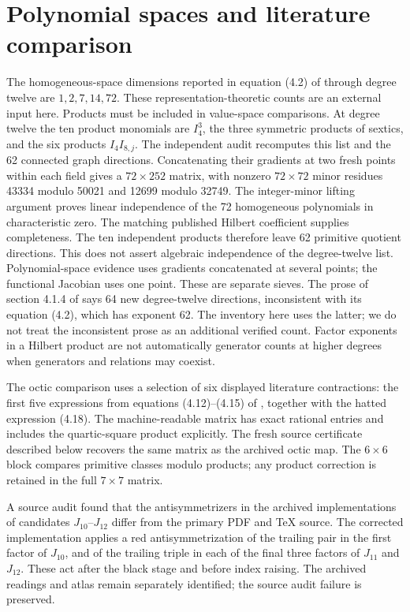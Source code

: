 \documentclass[11pt]{article}
\begin{document}
\section{Polynomial spaces and literature comparison}
The homogeneous-space dimensions reported in equation (4.2) of
\cite{cederwall} through degree twelve are $1,2,7,14,72$.
These representation-theoretic counts are an external input here. Products must be included in value-space comparisons.
At degree twelve the ten product monomials are $I_4^3$, the three symmetric
products of sextics, and the six products $I_4 I_{8,j}$. The independent audit
recomputes this list and the 62 connected graph directions. Concatenating
their gradients at two fresh points within each field gives a $72\times252$
matrix, with nonzero $72\times72$ minor residues 43334 modulo 50021 and 12699
modulo 32749. The integer-minor lifting argument proves linear independence
of the 72 homogeneous polynomials in characteristic zero. The matching
published Hilbert coefficient supplies completeness. The ten independent
products therefore leave 62 primitive quotient directions. This does not
assert algebraic independence of the degree-twelve list. Polynomial-space
evidence uses gradients concatenated at several points; the functional
Jacobian uses one point. These are separate sieves. The prose of section 4.1.4 of
\cite{cederwall} says 64 new degree-twelve directions, inconsistent with its
equation (4.2), which has exponent 62. The inventory here uses the latter;
we do not treat the inconsistent prose as an additional verified count.
Factor exponents in a Hilbert product are not automatically generator counts
at higher degrees when generators and relations may coexist.

The octic comparison uses a selection of six displayed literature
contractions: the first five expressions from equations (4.12)--(4.15) of
\cite{cederwall}, together with the hatted expression (4.18). The
machine-readable matrix has exact rational entries and includes
the quartic-square product explicitly. The fresh source certificate described
below recovers the same matrix as the archived octic map.
The $6\times6$ block compares primitive classes modulo products; any product
correction is retained in the full $7\times7$ matrix.

A source audit found that the antisymmetrizers in the archived implementations
of candidates $J_{10}$--$J_{12}$ differ from the primary PDF and TeX source.
The corrected implementation applies a red antisymmetrization of the trailing
pair in the first factor of $J_{10}$, and of the trailing triple in each of
the final three factors of $J_{11}$ and $J_{12}$. These act after the black
stage and before index raising. The archived readings and atlas remain
separately identified; the source audit failure is preserved.
\end{document}
